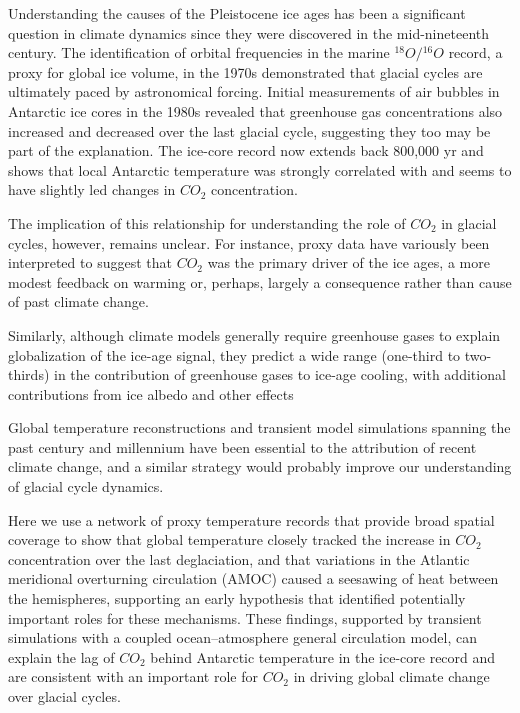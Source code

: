 \documentclass[
]{book}
\begin{document}
Understanding the causes of the Pleistocene ice ages has been a
significant question in climate dynamics since they were discovered in
the mid-nineteenth century. The identification of orbital frequencies
in the marine \({}^{18}O/{}^{16}O\) record, a proxy for global ice volume, in the
1970s demonstrated that glacial cycles are ultimately paced by
astronomical forcing.
Initial measurements of air bubbles in Antarctic ice
cores in the 1980s revealed that greenhouse gas concentrations also
increased and decreased over the last glacial cycle, suggesting they
too may be part of the explanation. The ice-core record now extends
back 800,000 yr and shows that local Antarctic temperature was
strongly correlated with and seems to have slightly led changes in
\(CO_2\) concentration.

The implication of this relationship for understanding the role of
\(CO_2\) in glacial cycles, however, remains unclear.
For instance, proxy data have variously been interpreted to suggest
that \(CO_2\) was the primary driver of the ice ages, a more modest
feedback on warming or, perhaps, largely a consequence rather than
cause of past climate change.

Similarly, although climate models
generally require greenhouse gases to explain globalization of the
ice-age signal, they predict a wide range (one-third to two-thirds) in
the contribution of greenhouse gases to ice-age cooling, with
additional contributions from ice albedo and other effects

Global temperature reconstructions and transient model simulations
spanning the past century and millennium have been essential to
the attribution of recent climate change, and a similar strategy would
probably improve our understanding of glacial cycle dynamics.

Here we use a network of proxy temperature records that provide broad
spatial coverage to show that global temperature closely tracked the
increase in \(CO_2\) concentration over the last deglaciation, and that
variations in the Atlantic meridional overturning circulation
(AMOC) caused a seesawing of heat between the hemispheres,
supporting an early hypothesis that identified potentially important
roles for these mechanisms.
These findings, supported by transient
simulations with a coupled ocean--atmosphere general circulation
model, can explain the lag of \(CO_2\) behind Antarctic temperature in
the ice-core record and are consistent with an important role for \(CO_2\)
in driving global climate change over glacial cycles.
\end{document}
